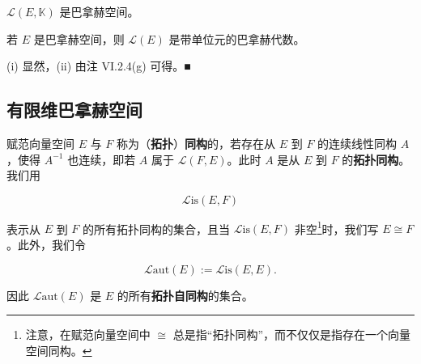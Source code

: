 \begin{corollary}

\begin{subitems}
\item

$ \mathcal{L}(E, \mathbb{K}) $ 是巴拿赫空间。

\item

若 $ E $ 是巴拿赫空间，则 $ \mathcal{L}(E) $ 是带单位元的巴拿赫代数。

\proofhead
(i) 显然，(ii) 由注 VI.2.4(g) 可得。\nobreak\hspace{0.35em}■
\end{subitems}

\end{corollary}

\subsection*{有限维巴拿赫空间}

赋范向量空间 $ E $ 与 $ F $ 称为（\textbf{拓扑}）\textbf{同构}的，若存在从 $ E $ 到 $ F $ 的连续线性同构 $ A $，使得 $ A^{-1} $ 也连续，即若 $ A $ 属于 $ \mathcal{L}(F, E) $。此时 $ A $ 是从 $ E $ 到 $ F $ 的\textbf{拓扑同构}。我们用

\[
\mathcal{L}\mathrm{is}(E, F)
\]

表示从 $ E $ 到 $ F $ 的所有拓扑同构的集合，且当 $ \mathcal{L}\mathrm{is}(E, F) $ 非空\footnote{注意，在赋范向量空间中 $ \cong $ 总是指“拓扑同构”，而不仅仅是指存在一个向量空间同构。}时，我们写 $ E \cong F $。此外，我们令

\[
\mathcal{L}\mathrm{aut}(E) := \mathcal{L}\mathrm{is}(E, E) .
\]

因此 $ \mathcal{L}\mathrm{aut}(E) $ 是 $ E $ 的所有\textbf{拓扑自同构}的集合。

